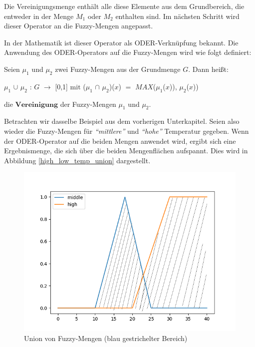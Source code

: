 Die Vereinigungsmenge enthält alle diese Elemente aus dem Grundbereich, die entweder in der Menge $M_1$ oder $M_2$ enthalten sind. Im nächsten Schritt wird dieser Operator an die Fuzzy-Mengen angepasst.

In der Mathematik ist dieser Operator als ODER-Verknüpfung bekannt. Die Anwendung des ODER-Operators auf die Fuzzy-Mengen wird wie folgt definiert:


\begin{definition}
	Seien $\mu_1$ und $\mu_2$ zwei Fuzzy-Mengen aus der Grundmenge $G$. Dann heißt:
	\begin{center}
		$\mu_1$ $\cup$ $\mu_2$ : $G$ $\rightarrow$ [0,1] $\text{mit}$  ($\mu_1$ $\cap$ $\mu_2$)($x$) $=$ $MAX$($\mu_1$($x$)), $\mu_2$($x$)) 
	\end{center}
	die $\textbf{Vereinigung}$ der Fuzzy-Mengen $\mu_1$ und $\mu_2$.
\end{definition}

Betrachten wir dasselbe Beispiel aus dem vorherigen Unterkapitel. Seien also wieder die Fuzzy-Mengen für \textit{``mittlere''} und \textit{``hohe''} Temperatur gegeben. Wenn der ODER-Operator auf die beiden Mengen anwendet wird, ergibt sich eine Ergebnismenge, die sich über die beiden Mengenflächen aufspannt. Dies wird in Abbildung \ref{high_low_temp_union} dargestellt.

\begin{figure}[H]
	\centering
	\includegraphics[scale=0.5]{images/oder_mid_high_temp.png}
	\caption{Union von Fuzzy-Mengen (blau gestrichelter Bereich)}
\end{figure}\label{high_low_temp_union}


